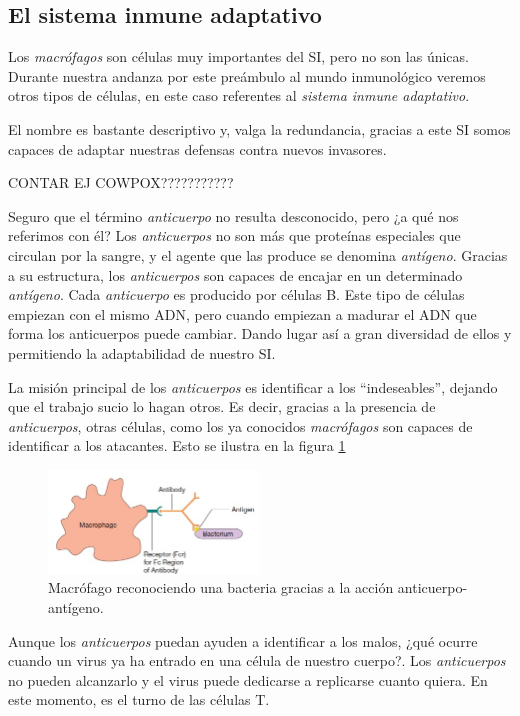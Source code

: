 \subsection{El sistema inmune adaptativo}

Los \textit{macrófagos} son células muy importantes del SI, pero no son las únicas. Durante nuestra andanza por este preámbulo al mundo inmunológico veremos otros tipos de células, en este caso referentes al \textit{sistema inmune adaptativo}.

El nombre es bastante descriptivo y, valga la redundancia, gracias a este SI somos capaces de adaptar nuestras defensas contra nuevos invasores.

CONTAR EJ COWPOX???????????

Seguro que el término \textit{anticuerpo} no resulta desconocido, pero ¿a qué nos referimos con él? Los \textit{anticuerpos} no son más que proteínas especiales que circulan por la sangre, y el agente que las produce se denomina \textit{antígeno}. Gracias a su estructura, los \textit{anticuerpos} son capaces de encajar en un determinado \textit{antígeno}. Cada \textit{anticuerpo} es producido por células B. Este tipo de células empiezan con el mismo ADN, pero cuando empiezan a madurar el ADN que forma los anticuerpos puede cambiar. Dando lugar así a gran diversidad de ellos y permitiendo la adaptabilidad de nuestro SI.

La misión principal de los \textit{anticuerpos} es identificar a los ``indeseables'', dejando que el trabajo sucio lo hagan otros. Es decir, gracias a la presencia de \textit{anticuerpos}, otras células, como los ya conocidos \textit{macrófagos} son capaces de identificar a los atacantes. Esto se ilustra en la figura \ref{fig:macrofago_anticuerpo}

\begin{figure}[t]
	\centering
	\includegraphics[width=0.5\textwidth]{2_macrofago_anticuerpo}
	\caption{Macrófago reconociendo una bacteria gracias a la acción anticuerpo-antígeno.}
	\label{fig:macrofago_anticuerpo}
\end{figure}

Aunque los \textit{anticuerpos} puedan ayuden a identificar a los malos, ¿qué ocurre cuando un virus ya ha entrado en una célula de nuestro cuerpo?. Los \textit{anticuerpos} no pueden alcanzarlo y el virus puede dedicarse a replicarse cuanto quiera. En este momento, es el turno de las células T. 

 